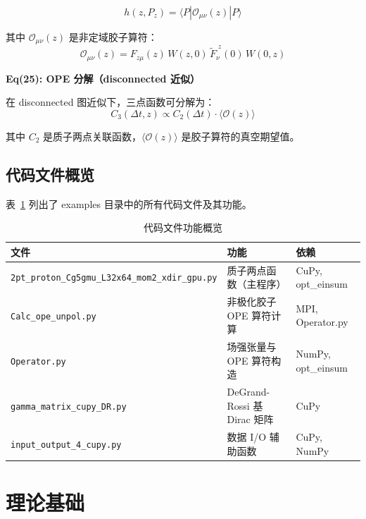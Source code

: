 \documentclass[12pt,a4paper]{ctexart}
\newcommand{\codefile}[1]{\texttt{#1}}
\begin{document}
\begin{equation}
h(z, P_z) = \langle P | \mathcal{O}_{\mu\nu}(z) | P \rangle
\end{equation}

其中 $\mathcal{O}_{\mu\nu}(z)$ 是非定域胶子算符：
\begin{equation}
\mathcal{O}_{\mu\nu}(z) = F_{z\mu}(z) \, W(z, 0) \, \tilde{F}_{\nu}^{\;z}(0) \, W(0, z)
\end{equation}

\textbf{Eq(25): OPE 分解（disconnected 近似）}

在 disconnected 图近似下，三点函数可分解为：
\begin{equation}
C_3(\Delta t, z) \propto C_2(\Delta t) \cdot \langle \mathcal{O}(z) \rangle
\end{equation}

其中 $C_2$ 是质子两点关联函数，$\langle \mathcal{O}(z) \rangle$ 是胶子算符的真空期望值。

\subsection{代码文件概览}

表~\ref{tab:files} 列出了 examples 目录中的所有代码文件及其功能。

\begin{table}[H]
\centering
\caption{代码文件功能概览}
\label{tab:files}
\begin{tabular}{lp{5cm}p{7cm}}
\toprule
\textbf{文件} & \textbf{功能} & \textbf{依赖} \\
\midrule
\codefile{2pt\_proton\_Cg5gmu\_L32x64\_mom2\_xdir\_gpu.py} & 质子两点函数（主程序） & CuPy, opt\_einsum \\
\codefile{Calc\_ope\_unpol.py} & 非极化胶子 OPE 算符计算 & MPI, Operator.py \\
\codefile{Operator.py} & 场强张量与 OPE 算符构造 & NumPy, opt\_einsum \\
\codefile{gamma\_matrix\_cupy\_DR.py} & DeGrand-Rossi 基 Dirac 矩阵 & CuPy \\
\codefile{input\_output\_4\_cupy.py} & 数据 I/O 辅助函数 & CuPy, NumPy \\
\bottomrule
\end{tabular}
\end{table}

\section{理论基础}
\end{document}
